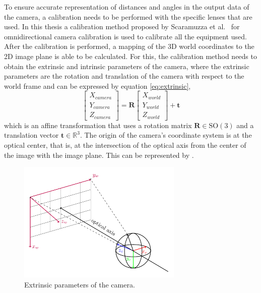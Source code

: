 To ensure accurate representation of distances and angles in the output data of the camera, a calibration needs to be performed with the specific lenses
that are used. In this thesis a calibration method proposed by Scaramuzza et al.~\cite{scaramuzzacalibration} for omnidirectional camera
calibration is used to calibrate all the equipment used. 
After the calibration is performed, a mapping of the 3D world coordinates to the 2D image plane is able to be calculated.
For this, the calibration method needs to obtain the extrinsic
and intrinsic parameters of the camera, where the extrinsic parameters are the rotation and translation of the camera with respect to the world frame and can be expressed by equation \ref{eq:extrinsic},
\begin{equation}
	\begin{bmatrix}
		X_{camera} \\
		Y_{camera} \\
		Z_{camera}
	\end{bmatrix}
	= \mathbf{R} 
  \begin{bmatrix}
	X_{world} \\
	Y_{world} \\
	Z_{world}
  \end{bmatrix}
  + \mathbf{t}
  \label{eq:extrinsic}
\end{equation}
which is an affine transformation that uses a rotation matrix $\mathbf{R} \in \text{SO}(3)$ and a translation vector
$\mathbf{t} \in \mathbb{R}^3$. The origin of the camera's coordinate system is at the optical center,
that is, at the intersection of the optical axis from the center of the image with the image plane. This can be represented by .

\begin{figure}[H]
  \centering
  \includegraphics[width=0.7\textwidth]{./fig/tikz/extrinsic.pdf}
  \caption{Extrinsic parameters of the camera. \cite{scaramuzzacalibration}}
  \label{fig:camera_extrinsic}
\end{figure}

